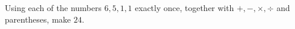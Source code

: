 Using each of the numbers $6,5,1,1$ exactly once, together with $+,-,\times,\div$ and parentheses, make $24$.
